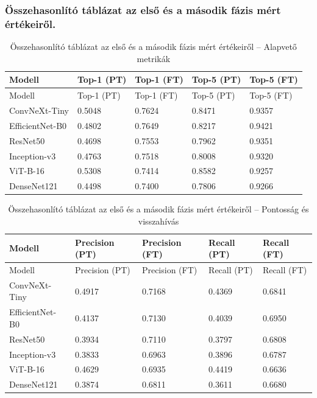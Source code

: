 \subsubsection{Összehasonlító táblázat az első és a második fázis mért értékeiről.}
    \begin{center}
        \begin{longtable}{lllll}
        \caption{Összehasonlító táblázat az első és a második fázis mért értékeiről – Alapvető metrikák}\label{tab:phase2_summary_table_02_basic}\\
        \toprule
        Modell & Top-1 (PT) & Top-1 (FT) & Top-5 (PT) & Top-5 (FT) \\
        \midrule
        \endfirsthead
        \toprule
        Modell & Top-1 (PT) & Top-1 (FT) & Top-5 (PT) & Top-5 (FT) \\
        \midrule
        \endhead
        ConvNeXt-Tiny & 0.5048 & 0.7624 & 0.8471 & 0.9357 \\
        EfficientNet-B0 & 0.4802 & 0.7649 & 0.8217 & 0.9421 \\
        ResNet50 & 0.4698 & 0.7553 & 0.7962 & 0.9351 \\
        Inception-v3 & 0.4763 & 0.7518 & 0.8008 & 0.9320 \\
        ViT-B-16 & 0.5308 & 0.7414 & 0.8582 & 0.9257 \\
        DenseNet121 & 0.4498 & 0.7400 & 0.7806 & 0.9266 \\
        \bottomrule
        \end{longtable}
    \end{center}
    

    \begin{center}
        \begin{longtable}{lllll}
        \caption{Összehasonlító táblázat az első és a második fázis mért értékeiről – Pontosság és visszahívás}\label{tab:phase2_summary_table_02_precision_recall}\\
        \toprule
        Modell & Precision (PT) & Precision (FT) & Recall (PT) & Recall (FT) \\
        \midrule
        \endfirsthead
        \toprule
        Modell & Precision (PT) & Precision (FT) & Recall (PT) & Recall (FT) \\
        \midrule
        \endhead
        ConvNeXt-Tiny & 0.4917 & 0.7168 & 0.4369 & 0.6841 \\
        EfficientNet-B0 & 0.4137 & 0.7130 & 0.4039 & 0.6950 \\
        ResNet50 & 0.3934 & 0.7110 & 0.3797 & 0.6808 \\
        Inception-v3 & 0.3833 & 0.6963 & 0.3896 & 0.6787 \\
        ViT-B-16 & 0.4629 & 0.6935 & 0.4419 & 0.6636 \\
        DenseNet121 & 0.3874 & 0.6811 & 0.3611 & 0.6680 \\
        \bottomrule
        \end{longtable}
    \end{center}
        

